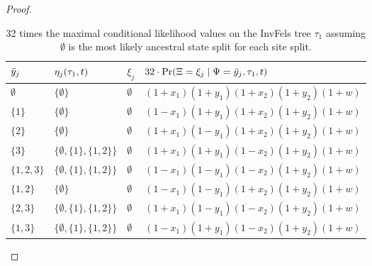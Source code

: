 \begin{proof}
\begin{table}
\centering
\begin{tabular}{|lll|l|}
\hline
$\tilde{y}_j$ & $\eta_j(\tau_1, t)$ & $\xi_j$ & $32\cdot\Pr(\Xi=\xi_j \mid \Psi=\tilde{y}_j,\tau_1,t)$\\
\hline
$\emptyset$&$\{\emptyset\}$&$\emptyset$&$(1+x_1)(1+y_1)(1+x_2)(1+y_2)(1+w)$\\
$\{1\}$    &$\{\emptyset\}$&$\emptyset$&$(1-x_1)(1+y_1)(1+x_2)(1+y_2)(1+w)$\\
$\{2\}$    &$\{\emptyset\}$&$\emptyset$&$(1+x_1)(1-y_1)(1+x_2)(1+y_2)(1+w)$\\
$\{3\}$    &$\{\emptyset,\{1\},\{1,2\}\}$&$\emptyset$&$(1+x_1)(1+y_1)(1-x_2)(1+y_2)(1+w)$\\
$\{1,2,3\}$&$\{\emptyset,\{1\},\{1,2\}\}$&$\emptyset$&$(1-x_1)(1-y_1)(1-x_2)(1+y_2)(1+w)$\\
$\{1,2\}$  &$\{\emptyset\}$&$\emptyset$&$(1-x_1)(1-y_1)(1+x_2)(1+y_2)(1+w)$\\
$\{2,3\}$  &$\{\emptyset,\{1\},\{1,2\}\}$&$\emptyset$&$(1+x_1)(1-y_1)(1-x_2)(1+y_2)(1+w)$\\
$\{1,3\}$  &$\{\emptyset,\{1\},\{1,2\}\}$&$\emptyset$&$(1-x_1)(1+y_1)(1-x_2)(1+y_2)(1+w)$\\
\hline
\end{tabular}
\caption{
32 times the maximal conditional likelihood values on the InvFels tree $\tau_1$ assuming $\emptyset$ is the most likely ancestral state split for each site split.
}
\label{tab:likelihoods-restricted}
\end{table}


\end{proof}

